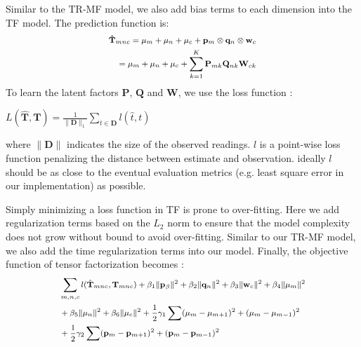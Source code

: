Similar to the TR-MF model, we also add bias terms to each dimension into the TF model. The prediction function is:
\begin{equation*}
\small
\begin{aligned}
\mathbf{\hat{T}}_{mnc}=\mu_m+\mu_n+\mu_c + \mathbf{p}_m \otimes \mathbf{q}_n\otimes \mathbf{w}_c
\\=\mu_m+\mu_n+\mu_c+\sum\limits_{k=1}^{K}\mathbf{P}_{m k} \mathbf{Q}_{n k} \mathbf{W}_{c k}
\end{aligned}
\end{equation*}
To learn the latent factors $\mathbf{P}$, $\mathbf{Q}$ and $\mathbf{W}$, we use the loss function :
\begin{center}
$L(\mathbf{\hat{T}},\mathbf{T})=\frac{1}{\|\mathbf{D}\|_1} \sum\limits_{t\in \mathbf{D}}  l(\hat{t},t)$
\end{center}
where $\|\mathbf{D}\|$ indicates the size of the observed readings.
$l$ is a point-wise loss function penalizing the distance between estimate and observation.
ideally $l$ should be as close to the eventual evaluation metrics (e.g. least square error in our implementation) as possible.

Simply minimizing a loss function in TF is prone to over-fitting. Here we add regularization terms based on the $L_2$ norm to ensure that the model complexity does not grow without bound to avoid over-fitting.
Similar to our TR-MF model, we also add the time regularization terms into our model.
Finally, the objective function of tensor factorization becomes :\\
\begin{equation*}
\small
\begin{aligned}
&\sum\limits_{m, n, c} l( \hat{\mathbf{T}}_{mnc}, \mathbf{T}_{mnc} )+\beta_1\|\mathbf{p}_{\beta}\|^2+\beta_2\|\mathbf{q}_n\|^2+\beta_3\|\mathbf{w}_c\|^2+\beta_4\|\mu_m\|^2\\
&+\beta_5\|\mu_n\|^2+\beta_6\|\mu_c\|^2+\frac{1}{2}\gamma_1\sum(\mu_m-\mu_{m+1})^2+(\mu_m-\mu_{m-1})^2
\\&
+\frac{1}{2}\gamma_2\sum(\mathbf{p}_m-\mathbf{p}_{m+1})^2+(\mathbf{p}_m-\mathbf{p}_{m-1})^2
\end{aligned}
\end{equation*}


